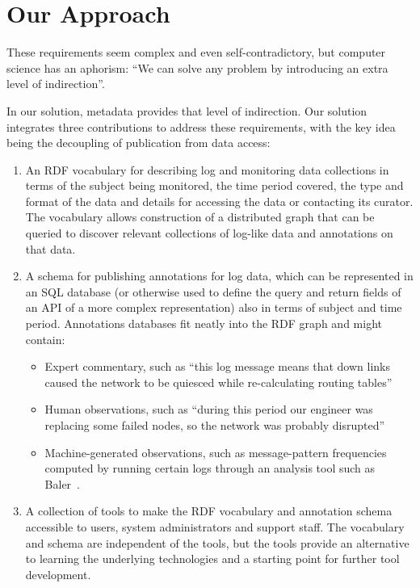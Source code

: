 \section{Our Approach}
\label{s:solution}

These requirements seem complex and even self-contradictory, but
computer science has an aphorism: ``We can solve any problem by
introducing an extra level of indirection''.

In our solution, metadata provides that level of indirection. 
Our solution integrates three contributions to address these 
requirements, with the key idea being the decoupling of publication 
from data access:

\begin{enumerate}
\item An RDF vocabulary for describing log and monitoring data collections
      in terms of the subject being monitored, the time period covered,
      the type and format of the data and details for accessing the data or
      contacting its curator. The vocabulary allows construction of a 
      distributed graph that can be queried to discover relevant collections
      of log-like data and annotations on that data.
      
\item A schema for publishing annotations for log data, which can be represented in an SQL 
	  database (or otherwise used to define the query and return fields of an API of a more complex representation)  also in terms of subject and time period. Annotations 
      databases fit neatly into the RDF graph and might contain:
      
\begin{itemize}
\item Expert commentary, such as ``this log message means that down links
      caused the network to be quiesced while re-calculating routing tables''      
\item Human observations, such as ``during this period our engineer was 
      replacing some failed nodes, so the network was probably disrupted'' 
\item Machine-generated observations, such as message-pattern frequencies 
      computed by running certain logs through an analysis tool such as 
      Baler~\cite{Baler}.
\end{itemize}

\item A collection of tools to make the RDF vocabulary and annotation 
      schema accessible to users, system administrators and support staff.
      The vocabulary and schema are independent of the tools, but 
      the tools provide an alternative to learning the underlying 
      technologies and a starting point for further tool development.

\end{enumerate}









